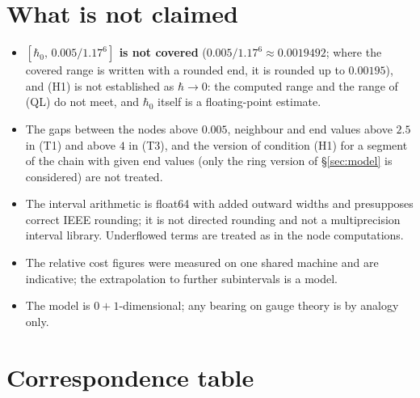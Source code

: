\documentclass[11pt,a4paper]{article}
\theoremstyle{definition}
\theoremstyle{remark}
\begin{document}
\section{What is not claimed}\label{sec:notclaimed}
\begin{itemize}[leftmargin=2em]
\item \textbf{$[\hbar_0,\,0.005/1.17^6]$ is not covered} ($0.005/1.17^6\approx0.0019492$; where the covered range is written with a rounded end, it is rounded up to $0.00195$), and (H1) is not established as $\hbar\to0$: the computed range and the range of (QL) do not meet, and $\hbar_0$ itself is a floating-point estimate.
\item The gaps between the nodes above $0.005$, neighbour and end values above $2.5$ in (T1) and above $4$ in (T3), and the version of condition (H1) for a segment of the chain with given end values (only the ring version of \S\ref{sec:model} is considered) are not treated.
\item The interval arithmetic is float64 with added outward widths and presupposes correct IEEE rounding; it is not directed rounding and not a multiprecision interval library. Underflowed terms are treated as in the node computations.

\item The relative cost figures were measured on one shared machine and are indicative; the extrapolation to further subintervals is a model.
\item The model is $0+1$-dimensional; any bearing on gauge theory is by analogy only.
\end{itemize}

\section{Correspondence table}\label{sec:corr}
\end{document}
